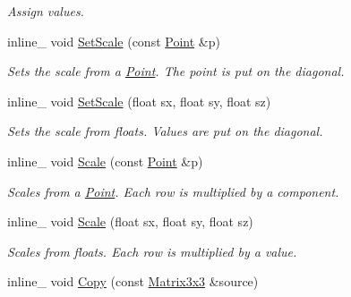 \begin{DoxyCompactItemize}
\begin{DoxyCompactList}\small\item\em Assign values. \end{DoxyCompactList}\item 
\hypertarget{class_matrix3x3_a3881bf406162edd7bff75f25eea7a38d}{inline\+\_\+ void \hyperlink{class_matrix3x3_a3881bf406162edd7bff75f25eea7a38d}{Set\+Scale} (const \hyperlink{class_point}{Point} \&p)}\label{class_matrix3x3_a3881bf406162edd7bff75f25eea7a38d}

\begin{DoxyCompactList}\small\item\em Sets the scale from a \hyperlink{class_point}{Point}. The point is put on the diagonal. \end{DoxyCompactList}\item 
\hypertarget{class_matrix3x3_ab41b04b95b68fef87e6acac6d1a35f55}{inline\+\_\+ void \hyperlink{class_matrix3x3_ab41b04b95b68fef87e6acac6d1a35f55}{Set\+Scale} (float sx, float sy, float sz)}\label{class_matrix3x3_ab41b04b95b68fef87e6acac6d1a35f55}

\begin{DoxyCompactList}\small\item\em Sets the scale from floats. Values are put on the diagonal. \end{DoxyCompactList}\item 
\hypertarget{class_matrix3x3_a19d9b0ee7f43f45120a9c33c625e83c3}{inline\+\_\+ void \hyperlink{class_matrix3x3_a19d9b0ee7f43f45120a9c33c625e83c3}{Scale} (const \hyperlink{class_point}{Point} \&p)}\label{class_matrix3x3_a19d9b0ee7f43f45120a9c33c625e83c3}

\begin{DoxyCompactList}\small\item\em Scales from a \hyperlink{class_point}{Point}. Each row is multiplied by a component. \end{DoxyCompactList}\item 
\hypertarget{class_matrix3x3_a5eab275f6204853875dd8837efdf695b}{inline\+\_\+ void \hyperlink{class_matrix3x3_a5eab275f6204853875dd8837efdf695b}{Scale} (float sx, float sy, float sz)}\label{class_matrix3x3_a5eab275f6204853875dd8837efdf695b}

\begin{DoxyCompactList}\small\item\em Scales from floats. Each row is multiplied by a value. \end{DoxyCompactList}\item 
\hypertarget{class_matrix3x3_a28ff52567bb186d38053a2740dbb23eb}{inline\+\_\+ void \hyperlink{class_matrix3x3_a28ff52567bb186d38053a2740dbb23eb}{Copy} (const \hyperlink{class_matrix3x3}{Matrix3x3} \&source)}\label{class_matrix3x3_a28ff52567bb186d38053a2740dbb23eb}


\end{DoxyCompactItemize}

